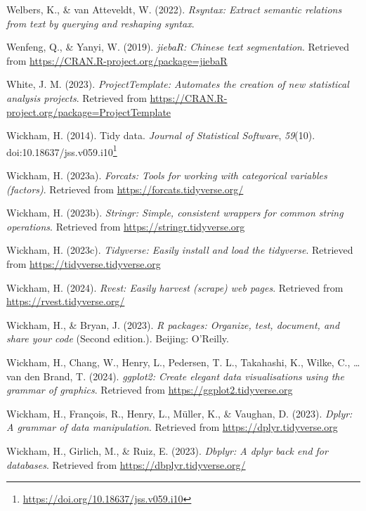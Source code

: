 \documentclass[
  letterpaper,
]{book}
\newlength{\cslhangindent}
\newenvironment{CSLReferences}[2] %
 {\begin{list}{}{%
  \setlength{\itemindent}{0pt}
  \setlength{\leftmargin}{0pt}
  \setlength{\parsep}{0pt}
  \ifodd #1
   \setlength{\leftmargin}{\cslhangindent}
   \setlength{\itemindent}{-1\cslhangindent}
  \fi
  \setlength{\itemsep}{#2\baselineskip}}}
 {\end{list}}
\theoremstyle{definition}
\theoremstyle{remark}
\DeclareRobustCommand{\href}[2]{#2\footnote{\url{#1}}}
\begin{document}
\begin{CSLReferences}{1}{0}
Welbers, K., \& van Atteveldt, W. (2022). \emph{Rsyntax: Extract
semantic relations from text by querying and reshaping syntax}.

Wenfeng, Q., \& Yanyi, W. (2019). \emph{jiebaR: Chinese text
segmentation}. Retrieved from
\url{https://CRAN.R-project.org/package=jiebaR}

White, J. M. (2023). \emph{ProjectTemplate: Automates the creation of
new statistical analysis projects}. Retrieved from
\url{https://CRAN.R-project.org/package=ProjectTemplate}

Wickham, H. (2014). Tidy data. \emph{Journal of Statistical Software},
\emph{59}(10).
doi:\href{https://doi.org/10.18637/jss.v059.i10}{10.18637/jss.v059.i10}

Wickham, H. (2023a). \emph{Forcats: Tools for working with categorical
variables (factors)}. Retrieved from
\url{https://forcats.tidyverse.org/}

Wickham, H. (2023b). \emph{Stringr: Simple, consistent wrappers for
common string operations}. Retrieved from
\url{https://stringr.tidyverse.org}

Wickham, H. (2023c). \emph{Tidyverse: Easily install and load the
tidyverse}. Retrieved from \url{https://tidyverse.tidyverse.org}

Wickham, H. (2024). \emph{Rvest: Easily harvest (scrape) web pages}.
Retrieved from \url{https://rvest.tidyverse.org/}

Wickham, H., \& Bryan, J. (2023). \emph{R packages: Organize, test,
document, and share your code} (Second edition.). Beijing: O'Reilly.

Wickham, H., Chang, W., Henry, L., Pedersen, T. L., Takahashi, K.,
Wilke, C., \ldots{} van den Brand, T. (2024). \emph{ggplot2: Create
elegant data visualisations using the grammar of graphics}. Retrieved
from \url{https://ggplot2.tidyverse.org}

Wickham, H., François, R., Henry, L., Müller, K., \& Vaughan, D. (2023).
\emph{Dplyr: A grammar of data manipulation}. Retrieved from
\url{https://dplyr.tidyverse.org}

Wickham, H., Girlich, M., \& Ruiz, E. (2023). \emph{Dbplyr: A dplyr back
end for databases}. Retrieved from \url{https://dbplyr.tidyverse.org/}


\end{CSLReferences}
\end{document}
